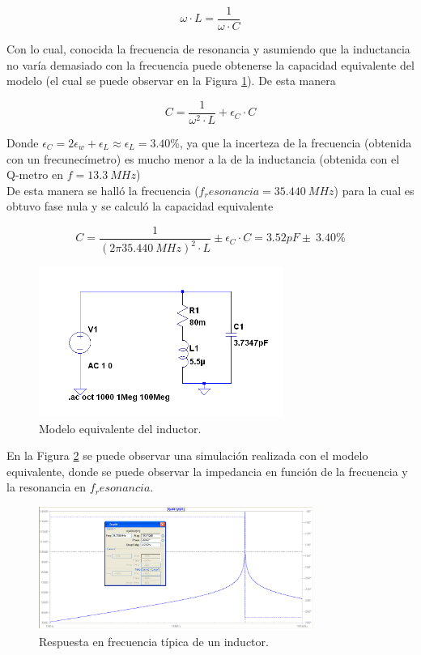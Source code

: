 \documentclass[a4paper,10pt]{article}
\begin{document}
		$$\omega\cdot L=\frac{1}{\omega \cdot C}$$
		
		\indent Con lo cual, conocida la frecuencia de resonancia y asumiendo 
		que la inductancia no var\'ia demasiado con la frecuencia puede 
		obtenerse la capacidad equivalente del modelo (el cual se puede observar
		en la Figura \ref{inductorequiv}). De esta manera
		
		$$C=\frac{1}{\omega^2 \cdot L}+\epsilon_C \cdot C$$
		
		\indent Donde $\epsilon_C=2\epsilon_w+\epsilon_L\approx \epsilon_L =
		3.40\%$, ya que la incerteza de la frecuencia (obtenida con un 
		frecunec\'imetro) es mucho menor a la de la inductancia (obtenida con el
		Q-metro en $f=13.3~MHz$) \\
		\indent De esta manera se hall\'o la frecuencia ($f_resonancia=
		35.440~MHz$) para la cual es obtuvo fase nula y se calcul\'o la 
		capacidad equivalente
		
		$$C=\frac{1}{(2\pi 35.440~MHz)^2 \cdot L}\pm \epsilon_C \cdot C=3.52pF \pm~3.40\%$$
		\begin{figure}[!htb]
			\centering
			\includegraphics[width=8cm]
			{Imagenes/induceqquiv.png}
			\caption{Modelo equivalente del inductor.}
			\label{inductorequiv} 
		\end{figure}
		
		\indent En la Figura \ref{respfreq} se puede observar una simulaci\'on 
		realizada con el modelo equivalente, donde se puede observar la 
		impedancia en funci\'on de la frecuencia y la resonancia en 
		$f_resonancia$.
		
		\begin{figure}[!htb]
			\centering
			\includegraphics[width=9cm]
			{Imagenes/respfreq.png}
			\caption{Respuesta en frecuencia t\'ipica de un inductor.}
			\label{respfreq} 
		\end{figure}
		
\end{document}
